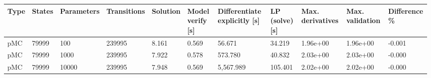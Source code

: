 \begin{tabular}{lllllllllll}
\toprule
Type & States & Parameters & Transitions & Solution & Model verify [s] & Differentiate explicitly [s] & LP (solve) [s] & Max. derivatives & Max. validation & Difference \% \\
\midrule
 pMC &  79999 &        100 &      239995 &    8.161 &            0.569 &                       56.671 &         34.219 &         1.96e+00 &        1.96e+00 &       -0.001 \\
 pMC &  79999 &       1000 &      239995 &    7.922 &            0.578 &                      573.780 &         40.832 &         2.03e+00 &        2.03e+00 &       -0.000 \\
 pMC &  79999 &      10000 &      239995 &    7.948 &            0.569 &                    5,567.989 &        105.401 &         2.02e+00 &        2.02e+00 &       -0.000 \\
\bottomrule
\end{tabular}

